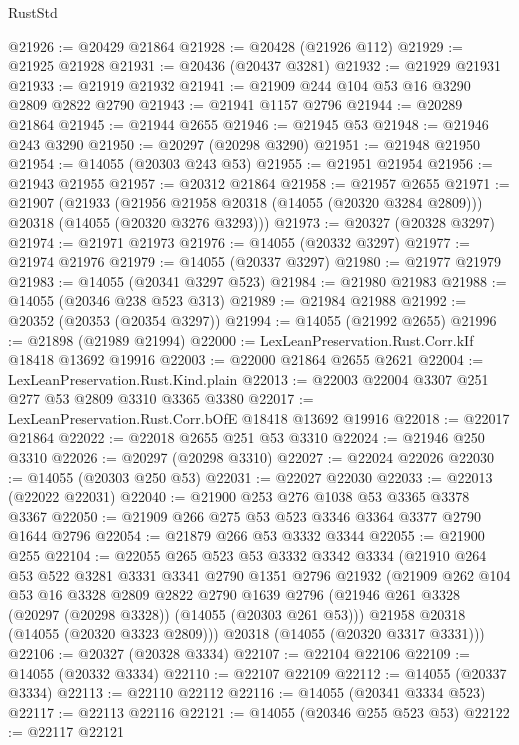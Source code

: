\begin{lexlean}{RustStd}
\begin{coremodule}
@21926 := @20429 @21864
@21928 := @20428 (@21926 @112)
@21929 := @21925 @21928
@21931 := @20436 (@20437 @3281)
@21932 := @21929 @21931
@21933 := @21919 @21932
@21941 := @21909 @244 @104 @53 @16 @3290 @2809 @2822 @2790
@21943 := @21941 @1157 @2796
@21944 := @20289 @21864
@21945 := @21944 @2655
@21946 := @21945 @53
@21948 := @21946 @243 @3290
@21950 := @20297 (@20298 @3290)
@21951 := @21948 @21950
@21954 := @14055 (@20303 @243 @53)
@21955 := @21951 @21954
@21956 := @21943 @21955
@21957 := @20312 @21864
@21958 := @21957 @2655
@21971 := @21907
    (@21933
      (@21956 @21958 @20318 (@14055 (@20320 @3284 @2809)))
      @20318
      (@14055 (@20320 @3276 @3293)))
@21973 := @20327 (@20328 @3297)
@21974 := @21971 @21973
@21976 := @14055 (@20332 @3297)
@21977 := @21974 @21976
@21979 := @14055 (@20337 @3297)
@21980 := @21977 @21979
@21983 := @14055 (@20341 @3297 @523)
@21984 := @21980 @21983
@21988 := @14055 (@20346 @238 @523 @313)
@21989 := @21984 @21988
@21992 := @20352 (@20353 (@20354 @3297))
@21994 := @14055 (@21992 @2655)
@21996 := @21898 (@21989 @21994)
@22000 := LexLeanPreservation.Rust.Corr.kIf @18418 @13692 @19916
@22003 := @22000 @21864 @2655 @2621
@22004 := LexLeanPreservation.Rust.Kind.plain
@22013 := @22003 @22004 @3307 @251 @277 @53 @2809 @3310 @3365 @3380
@22017 := LexLeanPreservation.Rust.Corr.bOfE @18418 @13692 @19916
@22018 := @22017 @21864
@22022 := @22018 @2655 @251 @53 @3310
@22024 := @21946 @250 @3310
@22026 := @20297 (@20298 @3310)
@22027 := @22024 @22026
@22030 := @14055 (@20303 @250 @53)
@22031 := @22027 @22030
@22033 := @22013 (@22022 @22031)
@22040 := @21900 @253 @276 @1038 @53 @3365 @3378 @3367
@22050 := @21909 @266 @275 @53 @523 @3346 @3364 @3377 @2790 @1644 @2796
@22054 := @21879 @266 @53 @3332 @3344
@22055 := @21900 @255
@22104 := @22055
    @265
    @523
    @53
    @3332
    @3342
    @3334
    (@21910
      @264
      @53
      @522
      @3281
      @3331
      @3341
      @2790
      @1351
      @2796
      @21932
      (@21909
        @262
        @104
        @53
        @16
        @3328
        @2809
        @2822
        @2790
        @1639
        @2796
        (@21946 @261 @3328 (@20297 (@20298 @3328)) (@14055 (@20303 @261 @53)))
        @21958
        @20318
        (@14055 (@20320 @3323 @2809)))
      @20318
      (@14055 (@20320 @3317 @3331)))
@22106 := @20327 (@20328 @3334)
@22107 := @22104 @22106
@22109 := @14055 (@20332 @3334)
@22110 := @22107 @22109
@22112 := @14055 (@20337 @3334)
@22113 := @22110 @22112
@22116 := @14055 (@20341 @3334 @523)
@22117 := @22113 @22116
@22121 := @14055 (@20346 @255 @523 @53)
@22122 := @22117 @22121

\end{coremodule}
\end{lexlean}
